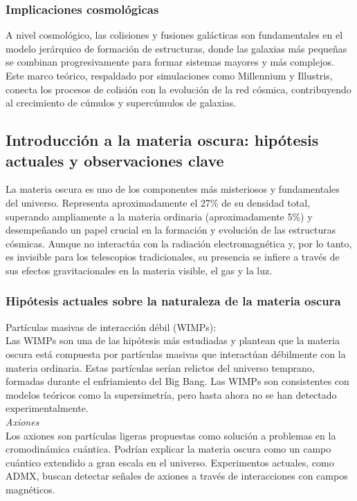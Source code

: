\documentclass{article}
\begin{document}
\subsubsection{Implicaciones cosmológicas}
A nivel cosmológico, las colisiones y fusiones galácticas son fundamentales en el modelo jerárquico de formación de estructuras, donde las galaxias más pequeñas se combinan progresivamente para formar sistemas mayores y más complejos. Este marco teórico, respaldado por simulaciones como Millennium y Illustris, conecta los procesos de colisión con la evolución de la red cósmica, contribuyendo al crecimiento de cúmulos y supercúmulos de galaxias.

\subsection{Introducción a la materia oscura: hipótesis actuales y observaciones clave}

La materia oscura es uno de los componentes más misteriosos y fundamentales del universo. Representa aproximadamente el 27\% de su densidad total, superando ampliamente a la materia ordinaria (aproximadamente 5\%) y desempeñando un papel crucial en la formación y evolución de las estructuras cósmicas. Aunque no interactúa con la radiación electromagnética y, por lo tanto, es invisible para los telescopios tradicionales, su presencia se infiere a través de sus efectos gravitacionales en la materia visible, el gas y la luz. \\

\subsubsection{Hipótesis actuales sobre la naturaleza de la materia oscura}
Partículas masivas de interacción débil (WIMPs): \\
Las WIMPs son una de las hipótesis más estudiadas y plantean que la materia oscura está compuesta por partículas masivas que interactúan débilmente con la materia ordinaria. Estas partículas serían relictos del universo temprano, formadas durante el enfriamiento del Big Bang. Las WIMPs son consistentes con modelos teóricos como la supersimetría, pero hasta ahora no se han detectado experimentalmente. \\

\textit{Axiones} \\
Los axiones son partículas ligeras propuestas como solución a problemas en la cromodinámica cuántica. Podrían explicar la materia oscura como un campo cuántico extendido a gran escala en el universo. Experimentos actuales, como ADMX, buscan detectar señales de axiones a través de interacciones con campos magnéticos. \\
\end{document}
